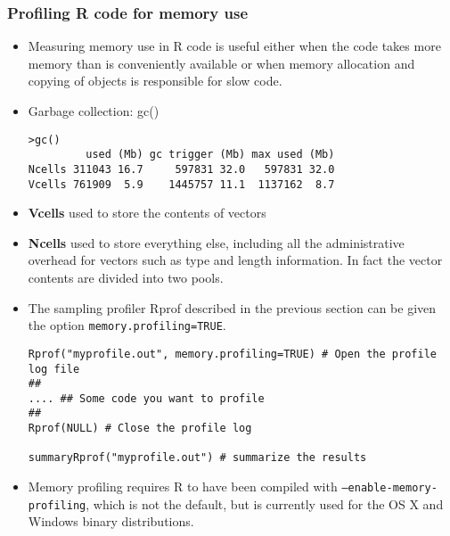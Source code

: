 \documentclass[10pt]{beamer}
\begin{document}
\begin{frame}
  \frametitle{Profiling R code for memory use}

  \begin{itemize}
  \item Measuring memory use in R code is useful either when the code
    takes more memory than is conveniently available or when memory
    allocation and copying of objects is responsible for slow code.

  \item Garbage collection: gc()

\begin{verbatim}
>gc()
         used (Mb) gc trigger (Mb) max used (Mb)
Ncells 311043 16.7     597831 32.0   597831 32.0
Vcells 761909  5.9    1445757 11.1  1137162  8.7
\end{verbatim}

  \item \textbf{Vcells} used to store the contents of vectors
  \item \textbf{Ncells} used to store everything else, including all the
    administrative overhead for vectors such as type and length
    information. In fact the vector contents are divided into two
    pools.

\item The sampling profiler Rprof described in the previous section can be given the option
\texttt{memory.profiling=TRUE}.
\begin{verbatim}
Rprof("myprofile.out", memory.profiling=TRUE) # Open the profile log file
##
.... ## Some code you want to profile
##
Rprof(NULL) # Close the profile log

summaryRprof("myprofile.out") # summarize the results

\end{verbatim}

\item Memory profiling requires R to have been compiled with
  \texttt{--enable-memory-profiling}, which is not the default, but is
  currently used for the OS X and Windows binary distributions.

  \end{itemize}

\end{frame}
\end{document}
